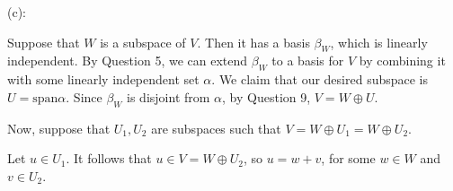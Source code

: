 \documentclass{article}
\theoremstyle{plain} %
\numberwithin{thm}{section} %
\theoremstyle{definition}
\begin{document}
\begin{question}{11}
        \medskip

        (c):

        Suppose that \(W\) is a subspace of \(V\). Then it has a basis \(\beta _W\), which is linearly independent. By Question 5, we can extend \(\beta _W\) to a basis for \(V\) by combining it with some linearly independent set \(\alpha\). We claim that our desired subspace is \(U = \mathrm{span} \alpha\). Since \(\beta _W\) is disjoint from \(\alpha\), by Question 9, \(V = W \oplus U\).

        Now, suppose that \(U_1, U_2\) are subspaces such that \(V = W \oplus U_1 = W\oplus U_2\).

        Let \(u \in U_1\). It follows that \(u \in V = W \oplus U_2\), so \(u = w + v\), for some \(w \in W\) and \(v \in U_2\).
    \end{question}
\end{document}
